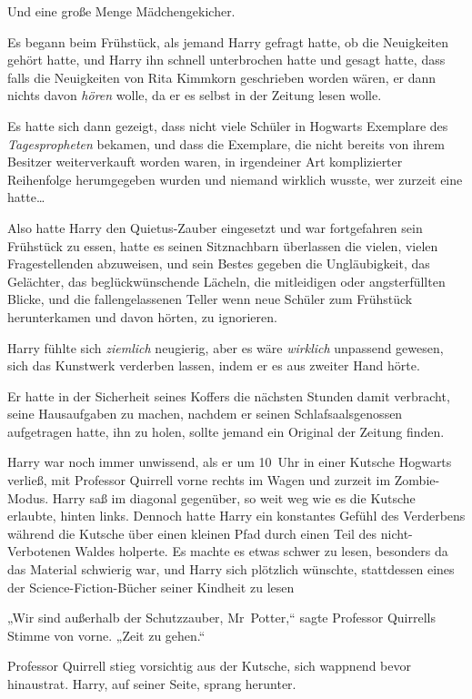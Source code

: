 {Und eine große Menge Mädchengekicher.

Es begann beim Frühstück, als jemand Harry gefragt hatte, ob die Neuigkeiten gehört hatte, und Harry ihn schnell unterbrochen hatte und gesagt hatte, dass falls die Neuigkeiten von Rita Kimmkorn geschrieben worden wären, er dann nichts davon \emph{hören} wolle, da er es selbst in der Zeitung lesen wolle.

Es hatte sich dann gezeigt, dass nicht viele Schüler in Hogwarts Exemplare des \emph{Tagespropheten} bekamen, und dass die Exemplare, die nicht bereits von ihrem Besitzer weiterverkauft worden waren, in irgendeiner Art komplizierter Reihenfolge herumgegeben wurden und niemand wirklich wusste, wer zurzeit eine hatte…

Also hatte Harry den Quietus-Zauber eingesetzt und war fortgefahren sein Frühstück zu essen, hatte es seinen Sitznachbarn überlassen die vielen, vielen Fragestellenden abzuweisen, und sein Bestes gegeben die Ungläubigkeit, das Gelächter, das beglückwünschende Lächeln, die mitleidigen oder angsterfüllten Blicke, und die fallengelassenen Teller wenn neue Schüler zum Frühstück herunterkamen und davon hörten, zu ignorieren.

Harry fühlte sich \emph{ziemlich} neugierig, aber es wäre \emph{wirklich} unpassend gewesen, sich das Kunstwerk verderben lassen, indem er es aus zweiter Hand hörte.

Er hatte in der Sicherheit seines Koffers die nächsten Stunden damit verbracht, seine Hausaufgaben zu machen, nachdem er seinen Schlafsaalsgenossen aufgetragen hatte, ihn zu holen, sollte jemand ein Original der Zeitung finden.

Harry war noch immer unwissend, als er um 10~Uhr in einer Kutsche Hogwarts verließ, mit Professor Quirrell vorne rechts im Wagen und zurzeit im Zombie-Modus. Harry saß im diagonal gegenüber, so weit weg wie es die Kutsche erlaubte, hinten links. Dennoch hatte Harry ein konstantes Gefühl des Verderbens während die Kutsche über einen kleinen Pfad durch einen Teil des nicht-Verbotenen Waldes holperte. Es machte es etwas schwer zu lesen, besonders da das Material schwierig war, und Harry sich plötzlich wünschte, stattdessen eines der Science-Fiction-Bücher seiner Kindheit zu lesen \later

„Wir sind außerhalb der Schutzzauber, Mr~Potter,“ sagte Professor Quirrells Stimme von vorne. „Zeit zu gehen.“

Professor Quirrell stieg vorsichtig aus der Kutsche, sich wappnend bevor hinaustrat. Harry, auf seiner Seite, sprang herunter.

}

